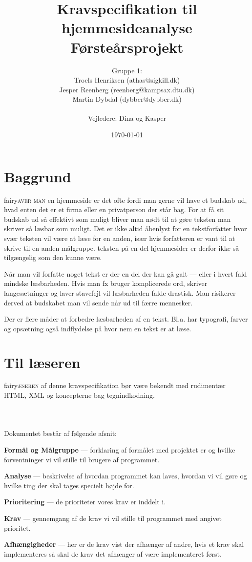 \documentclass[a4paper,oneside,article, titlepage]{article}
\title{Kravspecifikation til hjemmesideanalyse  \\
       \small{Førsteårsprojekt}}
\author
{
  Gruppe 1:\\
  Troels Henriksen (athas@sigkill.dk)\\
  Jesper Reenberg (reenberg@kampsax.dtu.dk)\\
  Martin Dybdal (dybber@dybber.dk)\\ \\
  Vejledere: Dina og Kasper
}
\date{\today}
\begin{document}
\maketitle
\tableofcontents
\newpage

\section{Baggrund}
\lettrine[lines=5,findent=0.5em,loversize=0.07,nindent=0em,image=true]%
{fairy}{aver man} en hjemmeside er det ofte fordi man gerne vil have
et budskab ud, hvad enten det er et firma eller en privatperson der
står bag. For at få sit budskab ud så effektivt som muligt bliver man
nødt til at gøre teksten man skriver så læsbar som muligt. Det er ikke
altid åbenlyst for en tekstforfatter hvor svær teksten vil være at
læse for en anden, især hvis forfatteren er vant til at skrive til en
anden målgruppe.  teksten på en del hjemmesider er derfor ikke så
tilgængelig som den kunne være.

Når man vil forfatte noget tekst er der en del der kan gå galt ---
eller i hvert fald mindske læsbarheden. Hvis man fx bruger
komplicerede ord, skriver langesætninger og laver stavefejl vil
læsbarheden falde drastisk. Man risikerer derved at budskabet man vil
sende når ud til færre mennesker.

Der er flere måder at forbedre læsbarheden af en tekst. Bl.a. har
typografi, farver og opsætning også indflydelse på hvor nem en tekst
er at læse.

\section{Til læseren}
\lettrine[lines=5,findent=0.5em,loversize=0.07,nindent=0em,image=true]%
{fairy}{æseren} af denne kravspecifikation bør være bekendt med rudimentær
HTML, XML og koncepterne bag tegnindkodning.
\\\\\\\\
Dokumentet består af følgende afsnit:
\begin{description}
\item \textbf{Formål og Målgruppe} --- forklaring af formålet med
  projektet er og hvilke forventninger vi vil stille til brugere af
  programmet.
\item \textbf{Analyse} --- beskrivelse af hvordan programmet kan
  laves, hvordan vi vil gøre og hvilke ting der skal tages specielt
  højde for.
\item \textbf{Prioritering} --- de prioriteter vores krav er inddelt
  i.
\item \textbf{Krav} --- gennemgang af de krav vi vil stille til
  programmet med angivet prioritet.
\item \textbf{Afhængigheder} --- her er de krav vist der afhænger af
  andre, hvis et krav skal implementeres så skal de krav det afhænger
  af være implementeret først.
\end{description}
\end{document}
